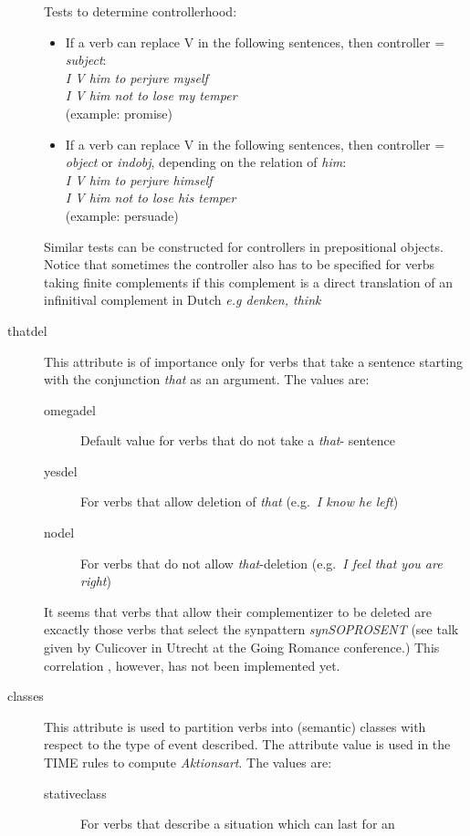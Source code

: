 \begin{description}
Tests to determine controllerhood: 
  \begin{itemize}
  \item  If a verb can replace V in the following sentences, then controller = 
 {\em subject\/}:\\
  {\em I V him to perjure myself\/}\\
  {\em I V him not to lose my temper\/}\\
  (example: promise)
  \item If a verb can replace V in the following sentences, then controller = {
\em object\/} or {\em indobj\/}, depending on the relation of {\em  him\/}:\\
  {\em I V him to perjure himself\/}\\
  {\em I V him not to lose his temper\/}\\
  (example: persuade)
  \end{itemize}
Similar tests can be constructed for controllers in prepositional objects.
Notice that sometimes the controller also has to be specified for verbs taking 
finite complements if this complement is a direct translation of an infinitival 
complement in Dutch {\em e.g denken, think}
\item[thatdel] This attribute is of importance only for verbs that take a 
sentence starting with the conjunction {\em that\/} as an argument. The values 
are:
  \begin{description}
  \item[omegadel] Default value for verbs that do not take a {\em that\/}-
sentence
  \item[yesdel] For verbs that allow deletion of {\em that\/} (e.g.\ {\em I 
know he left\/})
  \item[nodel] For verbs that do not allow {\em that\/}-deletion (e.g.\ {\em I 
feel that you are right\/})
  \end{description}
It seems that verbs that allow their complementizer to be deleted are excactly 
those verbs that select the synpattern {\em synSOPROSENT} (see talk given by 
Culicover in Utrecht at the Going Romance conference.) This correlation
, however, has not 
been implemented yet.
\item[classes]  This attribute is used to partition verbs into (semantic) classes
with respect to the type of event described. The attribute value is used in the TIME 
rules to compute {\em  Aktionsart\/}. The values are:
  \begin{description}
  \item[stativeclass] For verbs that describe a situation which can last for an

\end{description}
\end{description}
